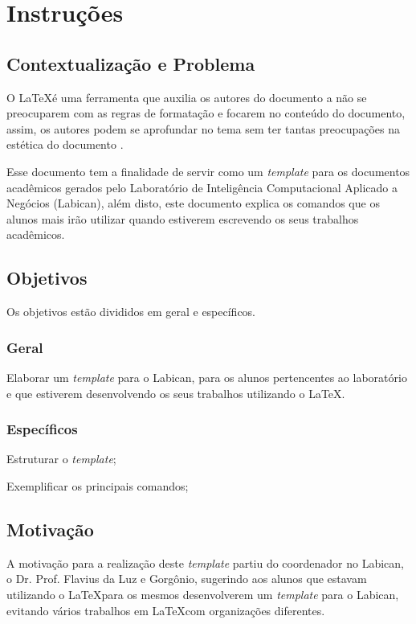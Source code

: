 \chapter{Instruções}
    \label{cha:instruções}
    \markright{}
    
    \section{Contextualização e Problema}
        \label{subsec:contextualizacao-problema}
        O \LaTeX é uma ferramenta que auxilia os autores do documento a não se preocuparem com as regras de formatação e focarem no conteúdo do documento, assim, os autores podem se aprofundar no tema sem ter tantas preocupações na estética do documento \cite{latex}.
    
        Esse documento tem a finalidade de servir como um \textit{template} para os documentos acadêmicos gerados pelo Laboratório de Inteligência Computacional Aplicado a Negócios (Labican), além disto, este documento explica os comandos que os alunos mais irão utilizar quando estiverem escrevendo os seus trabalhos acadêmicos.    

    \section{Objetivos}
        \label{sec:objetivos}
        Os objetivos estão divididos em geral e específicos.
    
        \subsection{Geral}
            \label{subsec:geral}
            Elaborar um \textit{template} para o Labican, para os alunos pertencentes ao laboratório e que estiverem desenvolvendo os seus trabalhos utilizando o \LaTeX.

        \subsection{Específicos}
            \label{subsec:especificos}
            \begin{alineas}[label=\roman*.]
                \item Estruturar o \textit{template};
                \item Exemplificar os principais comandos;
            \end{alineas}
    
    \section{Motivação}
        \label{sec:motivacao}
        A motivação para a realização deste \textit{template} partiu do coordenador no Labican, o Dr. Prof. Flavius da Luz e Gorgônio, sugerindo aos alunos que estavam utilizando o \LaTeX para os mesmos desenvolverem um \textit{template} para o Labican, evitando vários trabalhos em \LaTeX com organizações diferentes.
    
